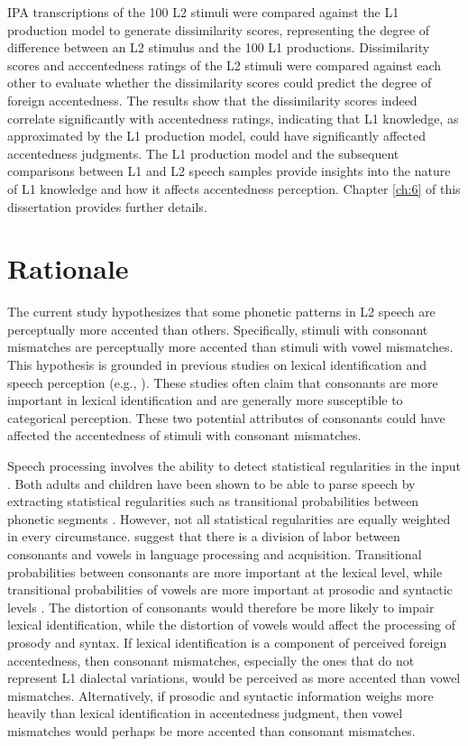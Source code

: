 IPA transcriptions of the 100 L2 stimuli were compared against the L1 production model to generate dissimilarity scores, representing the degree of difference between an L2 stimulus and the 100 L1 productions. Dissimilarity scores and acccentedness ratings of the L2 stimuli were compared against each other to evaluate whether the dissimilarity scores could predict the degree of foreign accentedness. The results show that the dissimilarity scores indeed correlate significantly with accentedness ratings, indicating that L1 knowledge, as approximated by the L1 production model, could have significantly affected accentedness judgments. The L1 production model and the subsequent comparisons between L1 and L2 speech samples provide insights into the nature of L1 knowledge and how it affects accentedness perception. Chapter \ref{ch:6} of this dissertation provides further details.


\section{Rationale}

The current study hypothesizes that some phonetic patterns in L2 speech are perceptually more accented than others. Specifically, stimuli with consonant mismatches are perceptually more accented than stimuli with vowel mismatches. This hypothesis is grounded in previous studies on lexical identification and speech perception  (e.g., \citealp{Kronrod_2012, Nespor_2003}). These studies often claim that consonants are more important in lexical identification and are generally more susceptible to categorical perception. These two potential attributes of consonants could have affected the accentedness of  stimuli with consonant mismatches.

Speech processing involves the ability to detect statistical regularities in the input \citep{Romberg_2010}. Both adults and children have been shown to be able to parse speech by extracting statistical regularities such as transitional probabilities between phonetic segments \citep{Romberg_2010}. However, not all statistical regularities are equally weighted in every circumstance. \citet{Nespor_2003} suggest that there is a division of labor between consonants and vowels in language processing and acquisition. Transitional probabilities between consonants are more important at the lexical level, while transitional probabilities of vowels are more important at prosodic and syntactic levels \citep{Nespor_2003}. The distortion of consonants would therefore be more likely to impair lexical identification, while the distortion of vowels would affect the processing of prosody and syntax. If lexical identification is a component of perceived foreign accentedness, then consonant mismatches, especially the ones that do not represent L1 dialectal variations, would be perceived as more accented than vowel mismatches. Alternatively, if prosodic and syntactic information weighs more heavily than lexical identification in accentedness judgment, then vowel mismatches would perhaps be more accented than consonant mismatches. 

